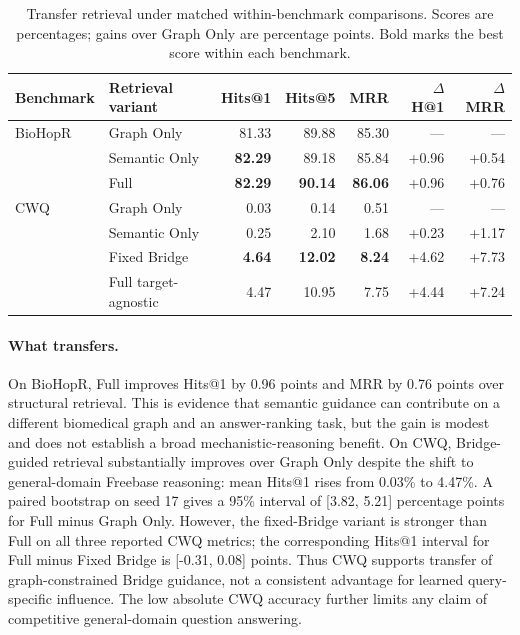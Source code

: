 \documentclass{article} %
\begin{document}
\begin{table}[t]
\centering
\small
\setlength{\tabcolsep}{4pt}
\caption{Transfer retrieval under matched within-benchmark comparisons. Scores are percentages; gains over Graph Only are percentage points. Bold marks the best score within each benchmark.}
\label{tab:transfer_results}
\begin{tabular*}{\linewidth}{@{\extracolsep{\fill}}llrrrrr@{}}
\toprule
Benchmark & Retrieval variant & Hits@1 & Hits@5 & MRR & $\Delta$H@1 & $\Delta$MRR \\
\midrule
BioHopR & Graph Only & 81.33 & 89.88 & 85.30 & --- & --- \\
        & Semantic Only & \textbf{82.29} & 89.18 & 85.84 & +0.96 & +0.54 \\
        & Full & \textbf{82.29} & \textbf{90.14} & \textbf{86.06} & +0.96 & +0.76 \\
\addlinespace
CWQ & Graph Only & 0.03 & 0.14 & 0.51 & --- & --- \\
    & Semantic Only & 0.25 & 2.10 & 1.68 & +0.23 & +1.17 \\
    & Fixed Bridge & \textbf{4.64} & \textbf{12.02} & \textbf{8.24} & +4.62 & +7.73 \\
    & Full target-agnostic & 4.47 & 10.95 & 7.75 & +4.44 & +7.24 \\
\bottomrule
\end{tabular*}
\end{table}

\paragraph{What transfers.}
On BioHopR, Full improves Hits@1 by 0.96 points and MRR by 0.76 points over structural retrieval. This is evidence that semantic guidance can contribute on a different biomedical graph and an answer-ranking task, but the gain is modest and does not establish a broad mechanistic-reasoning benefit. On CWQ, Bridge-guided retrieval substantially improves over Graph Only despite the shift to general-domain Freebase reasoning: mean Hits@1 rises from 0.03\% to 4.47\%. A paired bootstrap on seed 17 gives a 95\% interval of [3.82, 5.21] percentage points for Full minus Graph Only. However, the fixed-Bridge variant is stronger than Full on all three reported CWQ metrics; the corresponding Hits@1 interval for Full minus Fixed Bridge is [-0.31, 0.08] points. Thus CWQ supports transfer of graph-constrained Bridge guidance, not a consistent advantage for learned query-specific influence. The low absolute CWQ accuracy further limits any claim of competitive general-domain question answering.
\end{document}
